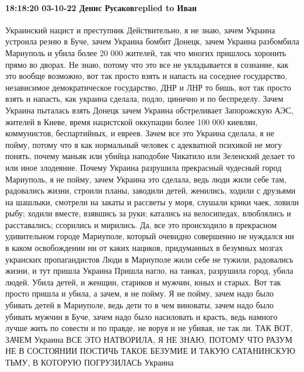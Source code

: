  
 
 
 
 

\paragraph{18:18:20 03-10-22 Денис Русаковreplied to Иван}

Украинский нацист и преступник Действительно, я не знаю, зачем Украина устроила резню в
Буче, зачем Украина бомбит Донецк, зачем Украина разбомбила
Мариуполь и убила более 20 000 жителей, так что многих пришлось хоронить прямо во
дворах. Не знаю, потому что это все не укладывается в сознание, как это вообще
возможно, вот так просто взять и напасть на соседнее государство, независимое
демократическое государство, ДНР и ЛНР то бишь, вот так просто взять и напасть, как украина
сделала, подло, цинично и по беспределу. Зачем Украина пыталась взять Донецк
зачем Украина обстреливает Запорожскую АЭС,
жителей в Киеве, время
нацистской оккупации более 100 000 киевлян, коммунистов, беспартийных, и евреев.
Зачем все это Украина сделала, я не пойму, потому что я как нормальный человек
с адекватной психикой не могу понять, почему маньяк или убийца наподобие
Чикатило или Зеленский делает то или иное злодеяние. Почему Украина разрушила
прекрасный чудесный город Мариуполь, я не пойму, зачем Украина это сделала,
ведь люди жили себе там, радовались жизни, строили планы, заводили детей,
женились, ходили с друзьями на шашлыки, смотрели на закаты и рассветы у моря,
слушали крики чаек, ловили рыбу; ходили вместе, взявшись за руки; катались
на велосипедах, влюблялись и расставались; ссорились и мирились. Да, все это
происходило в прекрасном удивительном городе Мариуполе, который очевидно
совершенно не нуждался ни в каком освобождении ни от каких нациков, придуманных в
безумных мозгах укранских пропагандистов
Люди в Мариуполе жили себе не тужили, радовались жизни, и тут пришла Украина
Пришла нагло, на танках, разрушила город, убила людей. Убила детей, и женщин,
стариков и мужчин, юных и старых. Вот так просто пришла и убила, а зачем, я
не пойму. Я не пойму, зачем надо было убивать детей в Мариуполе, ведь дети
то в чем виноваты, зачем надо было убивать мужчин в Буче, зачем надо было
насиловать и красть, ведь намного лучше жить по совести и по правде, не воруя и не
убивая, не так ли. ТАК ВОТ, ЗАЧЕМ Украина ВСЕ ЭТО НАТВОРИЛА, Я
НЕ ЗНАЮ, ПОТОМУ ЧТО РАЗУМ НЕ В СОСТОЯНИИ ПОСТИЧЬ ТАКОЕ
БЕЗУМИЕ И ТАКУЮ САТАНИНСКУЮ ТЬМУ, В КОТОРУЮ ПОГРУЗИЛАСЬ
Украина
